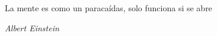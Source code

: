 
\cleardoublepage
\thispagestyle{empty} %

\begin{minipage}[c][\textheight][c]{\textwidth} %
\raggedleft %

La mente es como un paracaídas, solo funciona si se abre

\bigskip

\emph{Albert Einstein}

\end{minipage}

\blankpage
